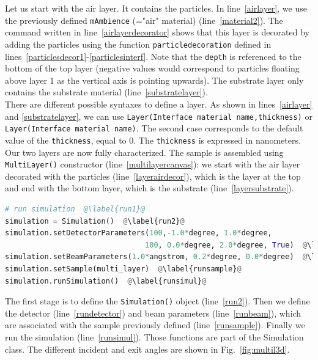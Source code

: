 \noindent Let us start with the air layer. It contains the particles. In
line~\ref{airlayer}, we use the previously defined \texttt{mAmbience}
(="air" material) (line~\ref{material2}). The command written in line~\ref{airlayerdecorator} shows that this layer is decorated by adding the
particles using the function \texttt{particledecoration} defined in
lines~\ref{particlesdecor1}-\ref{particlesinterf}. Note that the
\texttt{depth} is referenced to the bottom of the top layer (negative
values would correspond to particles floating above layer 1 as
the vertical axis is pointing upwards). The substrate layer
only contains the substrate material (line~\ref{substratelayer}).\\
 
\noindent There are different possible syntaxes to define a layer. As shown in
lines~\ref{airlayer} and \ref{substratelayer}, we can use
\texttt{Layer(Interface material name,thickness)} or
\texttt{Layer(Interface material name)}. The second case corresponds
to the default value of the \texttt{thickness}, equal to 0. The \texttt{thickness} is
expressed in  nanometers. \\

\noindent Our two layers are now fully characterized. The sample is assembled using
\texttt{MultiLayer()} constructor (line~\ref{multilayercanvas}): we start with the air layer decorated
with the particles (line~\ref{layerairdecor}), which is the layer at
the top and end with the bottom layer, which is the
substrate (line~\ref{layersubstrate}).


\begin{lstlisting}[language=python, style=eclipseboxed,name=ex1,nolol]
# run simulation  @\label{run1}@
simulation = Simulation()  @\label{run2}@
simulation.setDetectorParameters(100,-1.0*degree, 1.0*degree, 
                                100, 0.0*degree, 2.0*degree, True)  @\label{rundetector}@
simulation.setBeamParameters(1.0*angstrom, 0.2*degree, 0.0*degree)  @\label{runbeam}@
simulation.setSample(multi_layer)  @\label{runsample}@
simulation.runSimulation()  @\label{runsimul}@
\end{lstlisting}


\noindent The first stage is to define the \texttt{Simulation()} object (line~\ref{run2}). Then we define the detector (line~\ref{rundetector}) and beam
parameters (line~\ref{runbeam}), which are associated with the
sample previously defined (line~\ref{runsample}). Finally we run
the simulation (line~\ref{runsimul}). Those functions are part of the Simulation
class.  The
different incident and exit angles are
shown in Fig.~\ref{fig:multil3d}. \\

